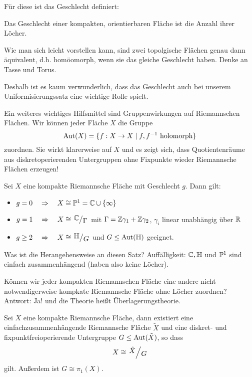 Für diese ist das Geschlecht definiert:

\begin{defin}
  Das Geschlecht einer kompakten, orientierbaren Fläche ist die Anzahl
  ihrer Löcher.
\end{defin}

Wie man sich leicht vorstellen kann, sind zwei topolgische Flächen
genau dann äquivalent, d.h. homöomorph, wenn sie das gleiche
Geschlecht haben. Denke an Tasse und Torus.

Deshalb ist es kaum verwunderlich, dass das Geschlecht auch bei unserem
Uniformisierungssatz eine wichtige Rolle spielt. 

Ein weiteres wichtiges Hilfsmittel sind Gruppenwirkungen auf
Riemannschen Flächen. Wir können jeder Fläche $X$ die Gruppe
\[
\Aut(X) = \{ f: X \ra X \mid f, f^{-1} \text{ holomorph}\}
\]
zuordnen. Sie wirkt klarerweise auf $X$ und es zeigt sich, dass
Quotientenräume aus
diskretoperierenden Untergruppen ohne Fixpunkte wieder Riemannsche
Flächen erzeugen!

\begin{thm}
  Sei $X$ eine kompakte Riemannsche Fläche mit Geschlecht $g$. Dann gilt:
  \begin{itemize}
  \item $g = 0 \quad \Ra \quad X \cong \P^1 = \C \cup \{\infty\}$
  \item $g = 1 \quad \Ra \quad X \cong \quot{\C}{\Gamma}$ mit $\Gamma
    = \Z\gamma_1 + \Z \gamma_2$, $\gamma_i$ linear unabhängig über $\R$
  \item $g \geq 2 \quad \Ra \quad X \cong \quot{\h}{G}$ und $G \leq
    \Aut(\h)$ geeignet.
  \end{itemize}
\end{thm}

Was ist die Herangehensweise an diesen Satz? Auffälligkeit: $\C, \h$
und $\P^1$ sind einfach zusammenhängend (haben also keine Löcher).

Können wir jeder kompakten Riemannschen Fläche eine andere nicht
notwendigerweise kompkate Riemannsche Fläche
ohne Löcher zuordnen? Antwort: Ja! und die Theorie heißt
Überlagerungstheorie.

\begin{thm}
  Sei $X$ eine kompakte Riemannsche Fläche, dann existiert eine
  einfachzusammenhängende Riemannsche Fläche $\tilde X$ und eine
  diskret- und fixpunktfreioperierende Untergruppe $G \leq \Aut(\tilde
  X)$, so dass
  \[
  X \cong \quot{\tilde X}{G}
  \]
  gilt. Außerdem ist $G \cong \pi_1(X)$.
\end{thm}

